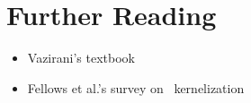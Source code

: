 \section{Further Reading}

\begin{frame}

  \begin{itemize}
   \item Vazirani's textbook \cite{Vazirani03}
   \item Fellows et al.'s survey on \VC\ kernelization \cite{FellowsJKRW18}
  \end{itemize}

\end{frame}


\begin{frame}[t, allowframebreaks]
	\printbibliography
\end{frame}




